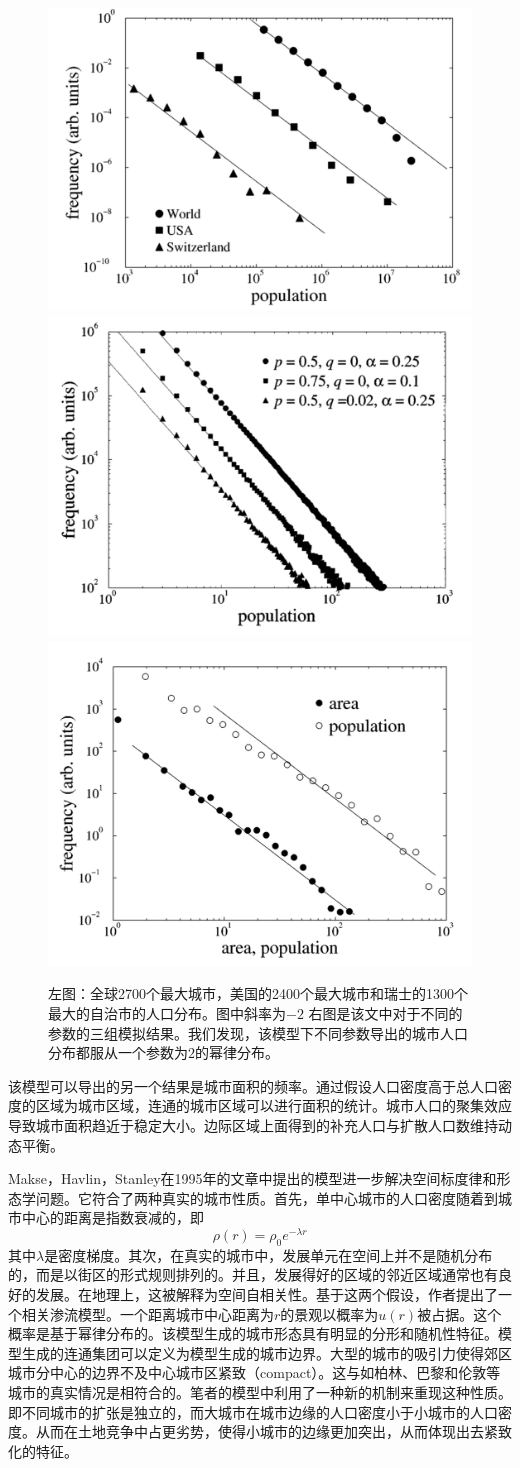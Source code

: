 \begin{figure}
    \centering
    \includegraphics[width = 0.3\linewidth]{pictures/roiiudreal.png}
    \includegraphics[width = 0.3\linewidth]{pictures/roiiud.png}
    \includegraphics[width = 0.3\linewidth]{pictures/roiiudarea.png}
    \caption{左图：全球2700个最大城市，美国的2400个最大城市和瑞士的1300个最大的自治市的人口分布\cite{PhysRevLett.79.523}。图中斜率为$-2$ 右图是该文中对于不同的参数的三组模拟结果。我们发现，该模型下不同参数导出的城市人口分布都服从一个参数为$2$的幂律分布。}
\end{figure}该模型可以导出的另一个结果是城市面积的频率。通过假设人口密度高于总人口密度的区域为城市区域，连通的城市区域可以进行面积的统计。城市人口的聚集效应导致城市面积趋近于稳定大小。边际区域上面得到的补充人口与扩散人口数维持动态平衡。

Makse，Havlin，Stanley在1995年的文章\cite{Makse1995}中提出的模型进一步解决空间标度律和形态学问题。它符合了两种真实的城市性质。首先，单中心城市的人口密度随着到城市中心的距离是指数衰减的，即\[\rho(r)=\rho_0 e^{-\lambda r}\]其中$\lambda$是密度梯度。其次，在真实的城市中，发展单元在空间上并不是随机分布的，而是以街区的形式规则排列的。并且，发展得好的区域的邻近区域通常也有良好的发展。在地理上，这被解释为空间自相关性。基于这两个假设，作者提出了一个相关渗流模型。一个距离城市中心距离为$r$的景观以概率为$u(r)$被占据。这个概率是基于幂律分布的。该模型生成的城市形态具有明显的分形和随机性特征。模型生成的连通集团可以定义为模型生成的城市边界。大型的城市的吸引力使得郊区城市分中心的边界不及中心城市区紧致（compact）。这与如柏林、巴黎和伦敦等城市的真实情况是相符合的\cite{Batty2006}。笔者的模型中利用了一种新的机制来重现这种性质。即不同城市的扩张是独立的，而大城市在城市边缘的人口密度小于小城市的人口密度。从而在土地竞争中占更劣势，使得小城市的边缘更加突出，从而体现出去紧致化的特征。

